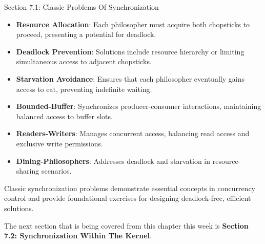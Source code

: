\begin{notes}{Section 7.1: Classic Problems Of Synchronization}
    \begin{highlight}
    
        \begin{itemize}
            \item \textbf{Resource Allocation}: Each philosopher must acquire both chopsticks to proceed, presenting a potential for deadlock.
            \item \textbf{Deadlock Prevention}: Solutions include resource hierarchy or limiting simultaneous access to adjacent chopsticks.
            \item \textbf{Starvation Avoidance}: Ensures that each philosopher eventually gains access to eat, preventing indefinite waiting.
        \end{itemize}
    
    \end{highlight}
    
    \begin{highlight}
    
        \begin{itemize}
            \item \textbf{Bounded-Buffer}: Synchronizes producer-consumer interactions, maintaining balanced access to buffer slots.
            \item \textbf{Readers-Writers}: Manages concurrent access, balancing read access and exclusive write permissions.
            \item \textbf{Dining-Philosophers}: Addresses deadlock and starvation in resource-sharing scenarios.
        \end{itemize}
    
    Classic synchronization problems demonstrate essential concepts in concurrency control and provide foundational exercises for designing deadlock-free, efficient solutions.
    
    \end{highlight}
\end{notes}

The next section that is being covered from this chapter this week is \textbf{Section 7.2: Synchronization Within The Kernel}.

